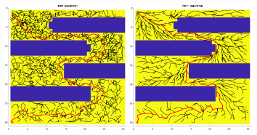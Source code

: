 \begin{figure}[H]
    \centering
    \includegraphics[width=0.48\textwidth]{./img/MATLAB/testing/03_RRT.pdf}
    \hspace{6pt}
    \includegraphics[width=0.48\textwidth]{./img/MATLAB/testing/03_RRT Star.pdf}

    \vspace{11pt}


\end{figure}
